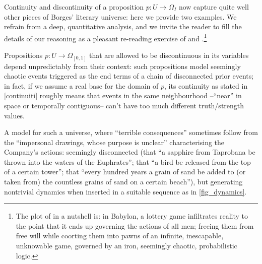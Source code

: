 Continuity and discontinuity of a proposition $p : U \to \Omega_I$ now capture quite well other pieces of Borges' literary universe: here we provide two examples. We refrain from a deep, quantitative analysis, and we invite the reader to fill the details of our reasoning as a pleasant re-reading exercise of \cite{babil} and \cite{tlonEN}.\footnote{The plot of \cite{babil} in a nutshell is: in Babylon, a lottery game infiltrates reality to the point that it ends up governing the actions of all men; freeing them from free will while coorting them into pawns of an infinite, inescapable, unknowable game, governed by an iron, seemingly chaotic, probabilistic logic.}
\begin{example}\label{bli}
	Propositions $p : U \to \Omega_{[0,1]}$ that are allowed to be discontinuous in its variables depend unpredictably from their context: such propositions model seemingly chaotic events triggered as the end terms of a chain of disconnected prior events; in fact, if we assume a real base for the domain of $p$, its continuity as stated in \autoref{continuiti} roughly means that events in the same neighbourhood --``near'' in space or temporally contiguous-- can't have too much different truth/strength values.

	A model for such a universe, where ``terrible consequences'' sometimes follow from the ``impersonal drawings, whose purpose is unclear'' characterising the Company's actions: seemingly disconnected (that ``a sapphire from Taprobana be thrown into the waters of the Euphrates''; that ``a bird be released from the top of a certain tower''; that ``every hundred years a grain of sand be added to (or taken from) the countless grains of sand on a certain beach''), but generating nontrivial dynamics when inserted in a suitable sequence as in \autoref{fig_dynamics}.


\end{example}
